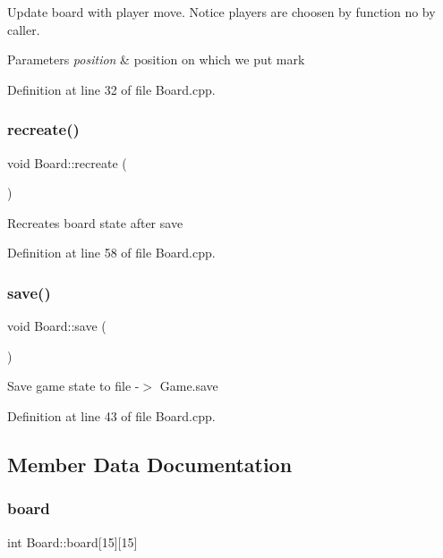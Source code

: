 Update board with player move. Notice players are choosen by function no by caller. 
\begin{DoxyParams}{Parameters}
{\em position} & position on which we put mark \\
\hline
\end{DoxyParams}


Definition at line 32 of file Board.\+cpp.

\mbox{\label{classBoard_aadae139aa7b1d53e7f9ae0ae0768f417}} 
\subsubsection{\texorpdfstring{recreate()}{recreate()}}
{\footnotesize\ttfamily void Board\+::recreate (\begin{DoxyParamCaption}{ }\end{DoxyParamCaption})}

Recreates board state after save 

Definition at line 58 of file Board.\+cpp.

\mbox{\label{classBoard_afc8625b4719496080a988c294869d56a}} 
\subsubsection{\texorpdfstring{save()}{save()}}
{\footnotesize\ttfamily void Board\+::save (\begin{DoxyParamCaption}{ }\end{DoxyParamCaption})}

Save game state to file -\/$>$ Game.\+save 

Definition at line 43 of file Board.\+cpp.



\subsection{Member Data Documentation}
\mbox{\label{classBoard_af588c465a63e9447a674398ec44446a9}} 
\subsubsection{\texorpdfstring{board}{board}}
{\footnotesize\ttfamily int Board\+::board\mbox{[}15\mbox{]}\mbox{[}15\mbox{]}\hspace{0.3cm}{\ttfamily [private]}}

